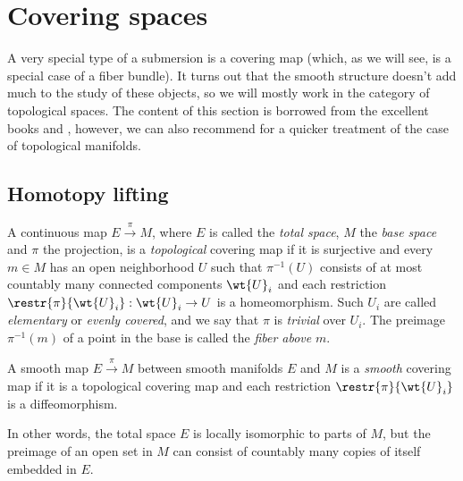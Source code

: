 \clearpage

\chapter{Covering spaces}

A very special type of a submersion is a covering map (which, as we will see, is a special case of a fiber bundle). It turns out that the smooth structure doesn't add much to the study of these objects, so we will mostly work in the category of topological spaces. The content of this section is borrowed from the excellent books \cite{Bredon} and  \cite{tomDieck}, however, we can also recommend \cite[Ch.~11]{LeeTop} for a quicker treatment of the case of topological manifolds.


\section{Homotopy lifting}



\begin{defn}
    A continuous map $E\overset{\pi}{\to} M$, where $E$ is called the \emph{total space}, $M$ the \emph{base space} and $\pi$ the projection, is a \emph{topological} covering map if it is surjective and every $m\in M$ has an open neighborhood $U$ such that $\pi^{-1}(U)$ consists of at most countably many connected components $\wt{U}_i$ and each restriction $\restr{\pi}{\wt{U}_i}:\wt{U}_i\to U$ is a homeomorphism. Such $U_i$ are called \emph{elementary} or \emph{evenly covered}, and we say that $\pi$ is \emph{trivial} over $U_i$. The preimage $\pi^{-1}(m)$ of a point in the base is called the \emph{fiber above} $m$.
\end{defn}

\begin{defn}
    A smooth map $E\overset{\pi}{\to} M$ between smooth manifolds $E$ and $M$ is a \emph{smooth} covering map if it is a topological covering map and each restriction $\restr{\pi}{\wt{U}_i}$ is a diffeomorphism.
\end{defn}

In other words, the total space $E$ is locally isomorphic to parts of $M$, but the preimage of an open set in $M$ can consist of countably many copies of itself embedded in $E$.

